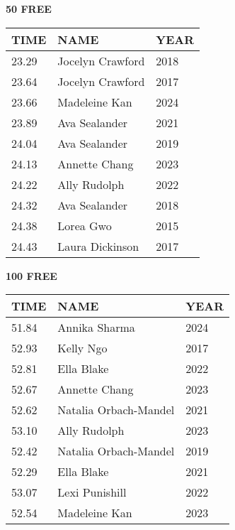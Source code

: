 \begin{minipage}[t]{0.48\textwidth}
\centering
\textbf{50 FREE}\\[0.05cm]
\begin{tabular}{@{}p{1.8cm}p{2.8cm}p{1.2cm}@{}}
\hline
\textbf{TIME} & \textbf{NAME} & \textbf{YEAR} \\
\hline
23.29 & Jocelyn Crawford & 2018 \\
23.64 & Jocelyn Crawford & 2017 \\
23.66 & Madeleine Kan & 2024 \\
23.89 & Ava Sealander & 2021 \\
24.04 & Ava Sealander & 2019 \\
24.13 & Annette Chang & 2023 \\
24.22 & Ally Rudolph & 2022 \\
24.32 & Ava Sealander & 2018 \\
24.38 & Lorea Gwo & 2015 \\
24.43 & Laura Dickinson & 2017 \\
\hline
\end{tabular}
\end{minipage}\hfill
\begin{minipage}[t]{0.48\textwidth}
\centering
\textbf{100 FREE}\\[0.05cm]
\begin{tabular}{@{}p{1.8cm}p{2.8cm}p{1.2cm}@{}}
\hline
\textbf{TIME} & \textbf{NAME} & \textbf{YEAR} \\
\hline
51.84 & Annika Sharma & 2024 \\
52.93 & Kelly Ngo & 2017 \\
52.81 & Ella Blake & 2022 \\
52.67 & Annette Chang & 2023 \\
52.62 & Natalia Orbach-Mandel & 2021 \\
53.10 & Ally Rudolph & 2023 \\
52.42 & Natalia Orbach-Mandel & 2019 \\
52.29 & Ella Blake & 2021 \\
53.07 & Lexi Punishill & 2022 \\
52.54 & Madeleine Kan & 2023 \\
\hline
\end{tabular}
\end{minipage}

\vspace{0.4cm}

